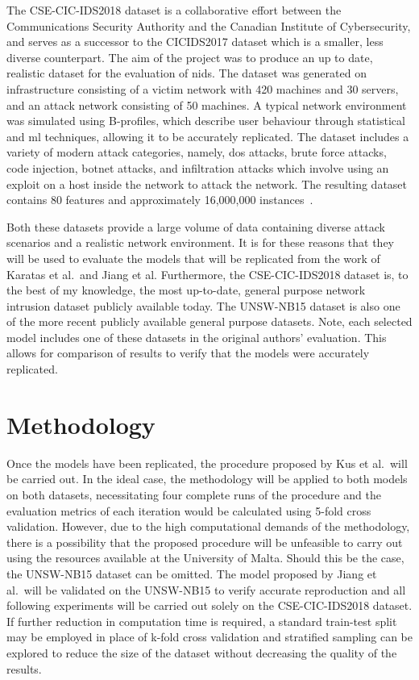 The CSE-CIC-IDS2018 dataset is a collaborative effort between the
Communications Security Authority and the Canadian Institute of Cybersecurity,
and serves as a successor to the CICIDS2017 dataset which is a smaller, less
diverse counterpart. The aim of the project was to produce an up to date,
realistic dataset for the evaluation of \gls{nids}. The dataset was generated
on infrastructure consisting of a victim network with 420 machines and 30
servers, and an attack network consisting of 50 machines. A typical network
environment was simulated using B-profiles, which describe user behaviour
through statistical and \gls{ml} techniques, allowing it to be accurately
replicated. The dataset includes a variety of modern attack categories, namely,
\gls{dos} attacks, brute force attacks, code injection, botnet attacks, and
infiltration attacks which involve using an exploit on a host inside the
network to attack the network. The resulting dataset contains 80 features and
approximately 16,000,000 instances~\cite{cic2018, cic2018data}.

Both these datasets provide a large volume of data containing diverse attack
scenarios and a realistic network environment. It is for these reasons that
they will be used to evaluate the models that will be replicated from the work
of Karatas et al.\ and Jiang et al. Furthermore, the CSE-CIC-IDS2018 dataset
is, to the best of my knowledge, the most up-to-date, general purpose network
intrusion dataset publicly available today. The UNSW-NB15 dataset is also one
of the more recent publicly available general purpose datasets. Note, each
selected model includes one of these datasets in the original authors'
evaluation. This allows for comparison of results to verify that the models
were accurately replicated.

\section{Methodology}%
\label{sec:methodology}

Once the models have been replicated, the procedure proposed by Kus et al.\
will be carried out. In the ideal case, the methodology will be applied to both
models on both datasets, necessitating four complete runs of the procedure and
the evaluation metrics of each iteration would be calculated using 5-fold cross
validation. However, due to the high computational demands of the methodology,
there is a possibility that the proposed procedure will be unfeasible to carry
out using the resources available at the University of Malta. Should this be
the case, the UNSW-NB15 dataset can be omitted. The model proposed by Jiang et
al.\ will be validated on the UNSW-NB15 to verify accurate reproduction and all
following experiments will be carried out solely on the CSE-CIC-IDS2018
dataset. If further reduction in computation time is required, a standard
train-test split may be employed in place of k-fold cross validation and
stratified sampling can be explored to reduce the size of the dataset without
decreasing the quality of the results.

